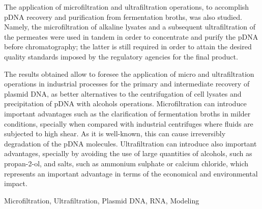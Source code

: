 \documentclass[10pt,twoside]{thesis}
\begin{document}
The application of microfiltration and ultrafiltration operations, to accomplish pDNA recovery and purification from fermentation broths, was also studied. Namely, the microfiltration of alkaline lysates and a subsequent ultrafiltration of the permeates were used in tandem in order to concentrate and purify the pDNA before chromatography; the latter is still required in order to attain the desired quality standards imposed by the regulatory agencies for the final product.

The results obtained allow to foresee the application of micro and ultrafiltration operations in industrial processes for the primary and intermediate recovery of plasmid DNA, as better alternatives to the centrifugation of cell lysates and precipitation of pDNA with alcohols operations. Microfiltration can introduce important advantages such as the clarification of fermentation broths in milder conditions, specially when compared with industrial centrifuges where fluids are subjected to high shear. As it is well-known, this can cause irreversibly degradation of the pDNA molecules. Ultrafiltration can introduce also important advantages, specially by avoiding the use of large quantities of alcohols, such as propan-2-ol, and salts, such as ammonium sulphate or calcium chloride, which represents an important advantage in terms of the economical and environmental impact. 

\vspace{0.8cm}
\noindent
{}

\vspace{0.5cm}
\noindent
Microfiltration, Ultrafiltration, Plasmid DNA, RNA, Modeling
\cleardoublepage

\tableofcontents

\listoffigures
\cleardoublepage	

\listoftables
\cleardoublepage

\printnomenclature
\cleardoublepage

\newpage
\section*{}

\vspace{0.5cm}

\begin{longtable}[l]
{llp{}}

\end{longtable}

\cleardoublepage

\mainmatter










\cleardoublepage
{}
{}



\appendix



\cleardoublepage
\cleardoublepage

\printindex
\end{document}
